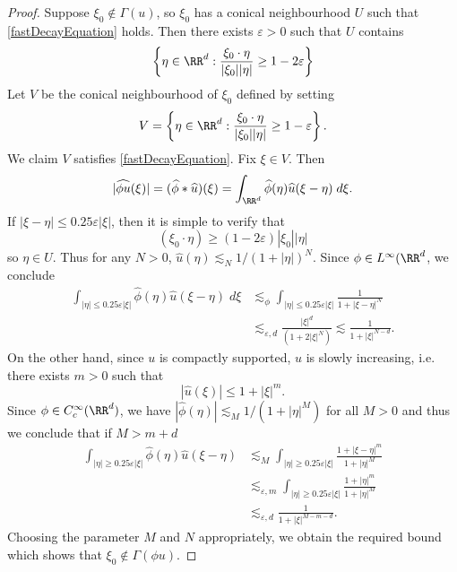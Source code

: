 \begin{proof}
  Suppose $\xi_0 \not \in \Gamma(u)$, so $\xi_0$ has a conical neighbourhood $U$ such that \eqref{fastDecayEquation} holds. Then there exists $\varepsilon > 0$ such that $U$ contains
  \[ \left\{ \eta \in \RR^d : \frac{\xi_0 \cdot \eta}{|\xi_0| |\eta|} \geq 1 - 2\varepsilon \right\} \]
  Let $V$ be the conical neighbourhood of $\xi_0$ defined by setting
  \[ V = \left\{ \eta \in \RR^d : \frac{\xi_0 \cdot \eta}{|\xi_0| |\eta|} \geq 1 - \varepsilon \right\}. \]
  We claim $V$ satisfies \eqref{fastDecayEquation}. Fix $\xi \in V$. Then
  \[ |\widehat{\phi u}(\xi)| = (\widehat{\phi} * \widehat{u})(\xi) = \int_{\RR^d} \widehat{\phi}(\eta) \widehat{u}(\xi - \eta)\; d\xi. \]
  If $|\xi - \eta| \leq 0.25 \varepsilon |\xi|$, then it is simple to verify that
  \[ (\xi_0 \cdot \eta) \geq (1 - 2\varepsilon) |\xi_0| |\eta| \]
  so $\eta \in U$. Thus for any $N > 0$, $\widehat{u}(\eta) \lesssim_N 1/(1 + |\eta|)^N$. Since $\phi \in L^\infty(\RR^d$, we conclude
  \begin{align*}
    \int_{|\eta| \leq 0.25 \varepsilon |\xi|} \widehat{\phi}(\eta) \widehat{u}(\xi - \eta)\; d\xi &\lesssim_{\phi} \int_{|\eta| \leq 0.25 \varepsilon |\xi|} \frac{1}{1 + |\xi - \eta|^N}\\
    &\lesssim_{\varepsilon,d} \frac{|\xi|^d}{(1 + 2 |\xi|^{N})} \lesssim \frac{1}{1 + |\xi|^{N-d}}.
  \end{align*}
  On the other hand, since $u$ is compactly supported, $\widehat{u}$ is slowly increasing, i.e. there exists $m > 0$ such that
  \[ |\widehat{u}(\xi)| \leq 1 + |\xi|^m. \]
  Since $\phi \in C_c^\infty(\RR^d)$, we have $|\widehat{\phi}(\eta)| \lesssim_M 1/(1 + |\eta|^M)$ for all $M > 0$ and thus we conclude that if $M > m + d$
  \begin{align*}
    \int_{|\eta| \geq 0.25 \varepsilon |\xi|} \widehat{\phi}(\eta) \widehat{u}(\xi - \eta) &\lesssim_M \int_{|\eta| \geq 0.25 \varepsilon |\xi|} \frac{1 + |\xi - \eta|^m}{1 + |\eta|^M}\\
    &\lesssim_{\varepsilon,m} \int_{|\eta| \geq 0.25 \varepsilon |\xi|} \frac{1 + |\eta|^m}{1 + |\eta|^M}\\
    &\lesssim_{\varepsilon,d} \frac{1}{1 + |\xi|^{M-m-d}}.
  \end{align*}
  Choosing the parameter $M$ and $N$ appropriately, we obtain the required bound which shows that $\xi_0 \not \in \Gamma(\phi u)$.
\end{proof}

